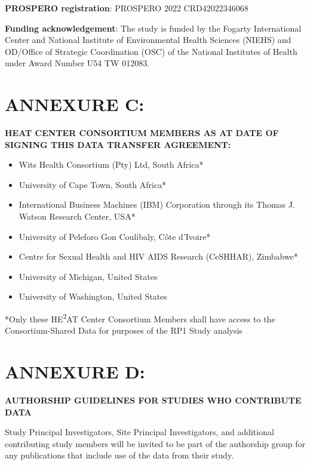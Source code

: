 \documentclass[12pt,letterpaper]{article}
\begin{document}
\textbf{PROSPERO registration}: PROSPERO 2022 CRD42022346068

\textbf{Funding acknowledgement}: The study is funded by the Fogarty International Center and National Institute of Environmental Health Sciences (NIEHS) and OD/Office of Strategic Coordination (OSC) of the National Institutes of Health under Award Number U54 TW 012083.

\newpage

\section*{ANNEXURE C:}

\textbf{HEAT CENTER CONSORTIUM MEMBERS AS AT DATE OF SIGNING THIS DATA TRANSFER AGREEMENT:}

\begin{itemize}
    \item Wits Health Consortium (Pty) Ltd, South Africa*
    \item University of Cape Town, South Africa*
    \item International Business Machines (IBM) Corporation through its Thomas J. Watson Research Center, USA*
    \item University of Peleforo Gon Coulibaly, Côte d'Ivoire*
    \item Centre for Sexual Health and HIV AIDS Research (CeSHHAR), Zimbabwe*
    \item University of Michigan, United States
    \item University of Washington, United States
\end{itemize}

*Only these HE\textsuperscript{2}AT Center Consortium Members shall have access to the Consortium-Shared Data for purposes of the RP1 Study analysis

\newpage

\section*{ANNEXURE D:}

\textbf{AUTHORSHIP GUIDELINES FOR STUDIES WHO CONTRIBUTE DATA}

Study Principal Investigators, Site Principal Investigators, and additional contributing study members will be invited to be part of the authorship group for any publications that include use of the data from their study.
\end{document}
